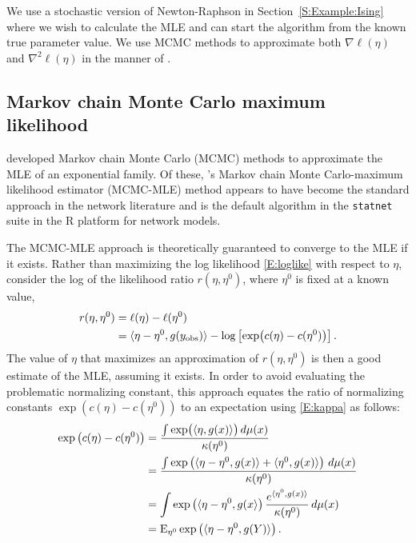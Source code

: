 We use a stochastic version of Newton-Raphson in Section~\ref{S:Example:Ising} where we wish
to calculate the MLE and can start the algorithm from the known true parameter value.
We use MCMC methods to approximate both $\nabla \ell(\eta)$ and $\nabla^2 \ell(\eta)$ 
in the manner of \citep{Penttinen:1984}.
\subsection{Markov chain Monte Carlo maximum likelihood} \label{S:MCMC-MLE}
\citet{Geyer:1992, Corander:1998, Snijders:2002} developed Markov chain Monte Carlo 
(MCMC) methods to approximate the MLE of an exponential family.  Of these, \citeauthor
{Geyer:1992}'s Markov chain Monte Carlo-maximum likelihood estimator (MCMC-MLE) method 
appears to have become the standard approach in the network literature 
\citep{Hunter:2006, Handcock:2006, GOF} and is the default algorithm in 
the \texttt{statnet} suite \citep{statnet:R} in the R platform for network models.  

The MCMC-MLE approach is theoretically guaranteed to converge to the MLE if it exists.  
Rather than maximizing the log likelihood \eqref{E:loglike}
with respect to $\eta$, \citeauthor{Geyer:1992} consider 
the log of the likelihood ratio $r( \eta, \eta^0 )$, where $\eta^0$ 
is fixed at a known value,
\begin{align}
 r( \eta, \eta^0 ) &= \ell( \eta ) - \ell( \eta^0 ) \notag \\ 
				  &= \langle  \eta - \eta^0, g(y_{\text{obs}}) \rangle - \log \left [ \exp \bigl( c(\eta) - c(\eta^0) \bigr) \right ].\label{E:r}
\end{align}
The value of $\eta$ that maximizes an
approximation of $r( \eta, \eta^0 )$ is then a good estimate of the MLE, 
assuming it exists.  In order to avoid evaluating the problematic normalizing constant,
this approach equates the ratio of normalizing constants 
$\exp \left (  c(\eta) - c(\eta^0) \right )$ to an expectation 
using \eqref{E:kappa} as follows:
\begin{align*}
	\exp \left (  c(\eta) - c(\eta^0) \right ) &= \frac{ \int \exp \bigl ( \langle  \eta, g(x)  \rangle\bigr ) \, d\mu(x) }{ \kappa(\eta^0)  } \\
	&= \frac{ \int \exp \left ( \langle  \eta - \eta^0, g(x) \rangle + \langle  \eta^0, g(x) \rangle \right ) \, d\mu(x)  }{ \kappa(\eta^0) } \\
	&= \int \exp \left( \langle \eta - \eta^0, g(x \rangle \right ) \frac{ e^ { \langle  \eta^0, g(x) \rangle } }{ \kappa(\eta^0) } \, d\mu(x)\\
	&= \operatorname{E}_{\eta^0} \exp \left( \langle  \eta - \eta^0, g(Y) \rangle  \right ) .
\end{align*}

